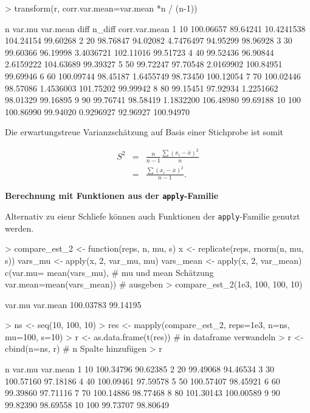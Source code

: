 \begin{Schunk}
\begin{Sinput}
> transform(r, corr.var.mean=var.mean *n / (n-1))
\end{Sinput}
\begin{Soutput}
     n    var.mu var.mean       diff    n_diff corr.var.mean
1   10 100.06657 89.64241 10.4241538 104.24154      99.60268
2   20  98.76847 94.02082  4.7476497  94.95299      98.96928
3   30  99.60366 96.19998  3.4036721 102.11016      99.51723
4   40  99.52436 96.90844  2.6159222 104.63689      99.39327
5   50  99.72247 97.70548  2.0169902 100.84951      99.69946
6   60 100.09744 98.45187  1.6455749  98.73450     100.12054
7   70 100.02446 98.57086  1.4536003 101.75202      99.99942
8   80  99.15451 97.92934  1.2251662  98.01329      99.16895
9   90  99.76741 98.58419  1.1832200 106.48980      99.69188
10 100 100.86990 99.94020  0.9296927  92.96927     100.94970
\end{Soutput}
\end{Schunk}

Die erwartungstreue Varianzschätzung auf Basis einer Stichprobe ist somit

\begin{eqnarray} \label{eq:var_sample}
  S^2 &=& \frac{n}{n-1} \frac{\sum{(x_i - \bar x)^2}}{n} \\  
           &=& \frac{\sum{(x_i - \bar x)^2}}{n-1}.
\end{eqnarray}

\par
\textbf{Berechnung mit Funktionen aus der \texttt{apply}-Familie}  

Alternativ zu eienr Schliefe können auch Funktionen der \texttt{apply}-Familie genutzt werden. 

\begin{Schunk}
\begin{Sinput}
> compare_est_2 <- function(reps, n, mu, s){
   x <- replicate(reps, rnorm(n, mu, s))
   vars_mu <- apply(x, 2, var_mu, mu)
   vars_mean <- apply(x, 2, var_mean)
   c(var.mu= mean(vars_mu),              # mu und mean Schätzung
     var.mean=mean(vars_mean))           # ausgeben  
 }
> compare_est_2(1e3, 100, 100, 10)
\end{Sinput}
\begin{Soutput}
   var.mu  var.mean 
100.03783  99.14195 
\end{Soutput}
\begin{Sinput}
> ns <- seq(10, 100, 10)
> res <- mapply(compare_est_2, reps=1e3, n=ns, mu=100, s=10)
> r <- as.data.frame(t(res))              # in dataframe verwandeln
> r <- cbind(n=ns, r)                     # n Spalte hinzufügen
> r
\end{Sinput}
\begin{Soutput}
     n    var.mu  var.mean
1   10 100.34796  90.62385
2   20  99.49068  94.46534
3   30 100.57160  97.18186
4   40 100.09461  97.59578
5   50 100.57407  98.45921
6   60  99.39860  97.71116
7   70 100.14886  98.77468
8   80 101.30143 100.00589
9   90  99.82390  98.69558
10 100  99.73707  98.80649
\end{Soutput}
\end{Schunk}


